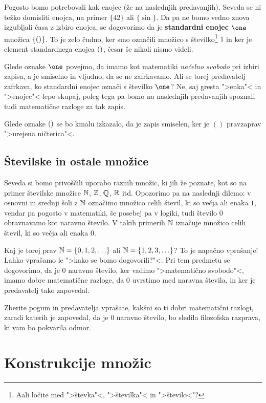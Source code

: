 Pogosto bomo potrebovali kak enojec (že na naslednjih predavanjih). Seveda se ni težko domisliti enojca, na primer $\{42\}$ ali $\{\sin\}$. Da pa ne bomo vedno znova izgubljali časa z izbiro enojca, se dogovorimo da je \textbf{standardni enojec $\one$} množica $\{()\}$. To je zelo čudno, ker smo označili množico s številko\footnote{Aali ločite med ">števka"<, ">številka"< in ">število<"?} $1$ in ker je element standardnega enojca $()$, česar še nikoli nismo videli.

Glede oznake $\one$ povejmo, da imamo kot matematiki \emph{načelno svobodo} pri izbiri zapisa, a je smiselno in vljudno, da se ne zafrkavamo. Ali se torej predavatelj zafrkava, ko standardni enojec označi s številko $\one$? Ne, saj gresta ">enka"< in ">enojec"< lepo skupaj, poleg tega pa bomo na naslednjih predavanjih spoznali tudi matematične razloge za tak zapis.

Glede oznake $()$ se bo kmalu izkazalo, da je zapis smiselen, ker je $()$ pravzaprav ">urejena ničterica"<.

\subsection{Številske in ostale množice}

Seveda si bomo privoščili uporabo raznih množic, ki jih že poznate, kot so na primer številske množice $\mathbb{N}$, $\mathbb{Z}$, $\mathbb{Q}$, $\mathbb{R}$ itd. Opozorimo pa na naslednji dilemo:
v osnovni in srednji šoli z $\mathbb{N}$ označimo množico celih števil, ki so večja ali enaka $1$, vendar pa pogosto v matematiki, še posebej pa v logiki, tudi število $0$ obravnavamo kot naravno število. V takih primerih $\mathbb{N}$ iznačuje množico celih števil, ki so večja ali enaka $0$.

Kaj je torej prav $\mathbb{N} = \{0, 1, 2, \ldots\}$ ali $\mathbb{N} = \{1, 2, 3, \ldots\}$? To je napačno vprašanje! Lahko vprašamo le ">kako se bomo dogovorili?"<. Pri tem predmetu se
dogovorimo, da je $0$ naravno število, ker vadimo ">matematično svobodo"<, imamo dobre matematične razloge, da $0$ uvrstimo med naravna števila, in ker je predavatelj tako zapovedal.

\begin{naloga}
  Zberite pogum in predavatelja vprašate, kakšni so ti dobri matematični razlogi, zaradi katerih je zapovedal, da je $0$ naravno število, bo sledila filozofska razprava, ki vam bo pokvarila odmor.
\end{naloga}

\section{Konstrukcije množic}

